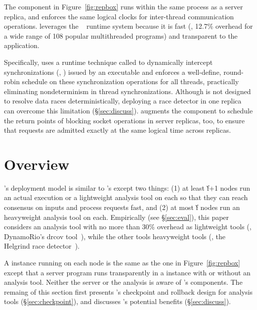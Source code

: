 The \dmt component in Figure~\ref{fig:repbox} runs within the same process as a server replica, and
enforces the same logical clocks for inter-thread communication
operations. \repbox leverages the \parrot~\cite{parrot:sosp13} \dmt runtime
system because it is fast (\ie, 12.7\% overhead for a wide range of 108 popular 
multithreaded programs) and transparent to the application.


Specifically, \parrot uses a runtime technique called \ldpreload to dynamically 
intercept \pthread synchronizations (\eg, \mutexlock) issued by an executable 
and enforces a well-define, round-robin schedule on these synchronization 
operations for all threads, practically eliminating nondeterminism in thread
synchronizations. Although \parrot is not designed to resolve data races
deterministically, deploying a race detector in one replica can overcome this 
limitation (\S\ref{sec:discuss}).  \repbox augments the \dmt component to schedule 
the return points of blocking socket operations in server replicas, too, to 
ensure that requests are admitted exactly at the same logical time across 
replicas.



\section{\xxx Overview} \label{sec:overview}

\xxx's deployment model is similar to \repbox's except two things: (1) at least \v{f}+1 nodes 
run an actual execution or a lightweight analysis tool on 
each so that they can reach consensus on inputs and process requests fast, and 
(2) at most \v{f} nodes run an heavyweight analysis tool on each. Empirically 
(see \S\ref{sec:eval}), this paper considers an analysis tool with no more than 30\% overhead as 
lightweight tools (\eg, DynamoRio's drcov tool~\cite{dynamorio}), while the other tools heavyweight 
tools (\eg, the Helgrind race detector~\cite{valgrind:pldi}).

A \xxx instance running on each node is the same as the one in 
Figure~\ref{fig:repbox} except that a server program runs transparently in a \xxx instance 
with or without an analysis tool. Neither the server or the analysis is aware of \xxx's 
components. The remaing of this section first presents \xxx's checkpoint and 
rollback design for analysis tools (\S\ref{sec:checkpoint}), and discusses \xxx's potential 
benefits (\S\ref{sec:discuss}).

